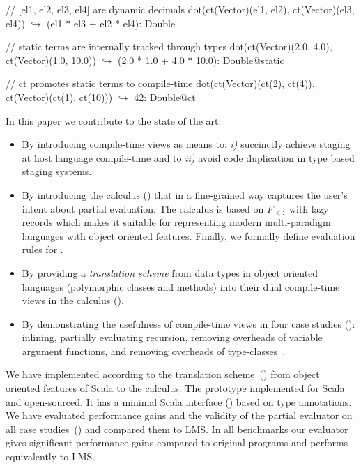 \vspace{1.8mm}
\begin{listing}[mathescape]
  // [el1, el2, el3, el4] are dynamic decimals
  dot(ct(Vector)(el1, el2), ct(Vector)(el3, el4))
    $\hookrightarrow$ (el1 * el3 + el2 * el4): Double

  // static terms are internally tracked through types
  dot(ct(Vector)(2.0, 4.0), ct(Vector)(1.0, 10.0))
    $\hookrightarrow$ (2.0 * 1.0 + 4.0 * 10.0): Double@static

  // ct promotes static terms to compile-time
  dot(ct(Vector)(ct(2), ct(4)),
      ct(Vector)(ct(1), ct(10)))
    $\hookrightarrow$ 42: Double@ct
\end{listing}
\vspace{1.8mm}

In this paper we contribute to the state of the art:
\begin{itemize}

 \item By introducing compile-time views as means to: \emph{i)} succinctly achieve staging
 at host language compile-time and to \emph{ii)} avoid code duplication in type based
 staging systems.

 \item By introducing the \calculus calculus () that in a
  fine-grained way captures the user's intent about partial evaluation. The calculus
  is based on $F_{<:}$ with lazy records which makes it suitable for representing
  modern multi-paradigm languages with object oriented features. Finally,
  we formally define evaluation rules for \calculus.

 \item By providing a \emph{translation scheme} from data types in object oriented languages
  (polymorphic classes and methods) into their dual compile-time views in the
  \calculus calculus ().

 \item By demonstrating the usefulness of compile-time views in four case
 studies (): inlining, partially evaluating recursion,
 removing overheads of variable argument functions, and removing overheads of
 type-classes~\cite{oliveira2010type}.

\end{itemize}

We have implemented \tool according to the translation
 scheme~() from object oriented features of Scala to
 the \calculus calculus. The prototype implemented for Scala and
 open-sourced\footnotemark[3]. It has a minimal Scala
 interface () based on type annotations. We have evaluated
 performance gains and the validity of the partial evaluator on all case
 studies~() and compared them to LMS. In all benchmarks
 our evaluator gives significant performance gains compared to original programs and
 performs equivalently to LMS.
